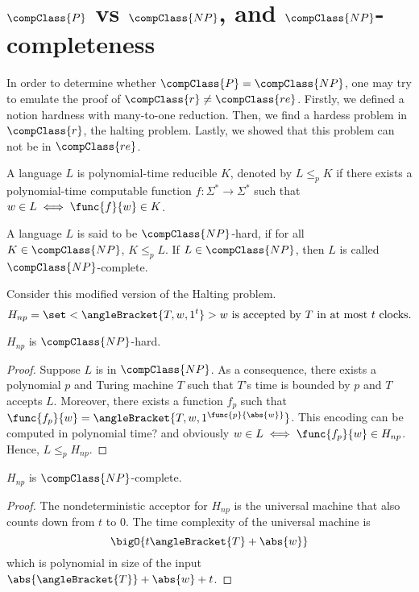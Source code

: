 \chapter{\(\compClass{P}\) vs \(\compClass{NP}\), and \(\compClass{NP}\)-completeness} 
In order to determine whether \(\compClass{P} = \compClass{NP}\), one may try to emulate the proof of \(\compClass{r} \neq \compClass{re}\). Firstly, we defined a notion hardness with many-to-one reduction. Then, we find a hardess problem in \(\compClass{r}\), the halting problem. Lastly, we showed that this problem can not be in \(\compClass{re}\).

\begin{definition}
    A language \(L\) is polynomial-time reducible \(K\), denoted by \(L \leq_p K\) if there exists a polynomial-time computable function \(f: \Sigma^{\ast} \to \Sigma^{\ast}\) such that \(w \in L \iff \func{f}{w} \in K\).
\end{definition}

\begin{definition}
    A language \(L\) is said to be \(\compClass{NP}\)-hard, if for all \(K \in \compClass{NP}\), \(K \leq_p L\). If \(L \in \compClass{NP}\), then \(L\) is called \(\compClass{NP}\)-complete.
\end{definition}

Consider this modified version of the Halting problem.
\begin{equation*}
    H_{np} = \set<\angleBracket{T,w,1^t}>{w \text{ is accepted by } T \text{ in at most } t \text{ clocks.}}
\end{equation*}

\begin{theorem}
    \(H_{np}\) is \(\compClass{NP}\)-hard.
\end{theorem}

\begin{proof}
    Suppose \(L\) is in \(\compClass{NP}\). As a consequence, there exists a polynomial \(p\) and Turing machine \(T\) such that \(T\)'s time is bounded by \(p\) and \(T\) accepts \(L\). Moreover, there exists a function \(f_p\) such that \(\func{f_p}{w} = \angleBracket{T,w,1^{\func{p}{\abs{w}}}}\). This encoding can be computed in polynomial time? and obviously \(w \in L \iff \func{f_p}{w} \in H_{np}\). Hence, \(L \leq_p H_{np}\).
\end{proof}

\begin{theorem}
    \(H_{np}\) is \(\compClass{NP}\)-complete. 
\end{theorem}

\begin{proof}
    The nondeterministic acceptor for \(H_{np}\) is the universal machine that also counts down from \(t\) to \(0\). The time complexity of the universal machine is 
    \begin{equation*}
        \bigO{t\angleBracket{T} + \abs{w}} 
    \end{equation*}
    which is polynomial in size of the input \(\abs{\angleBracket{T}} + \abs{w} + t\).
\end{proof}